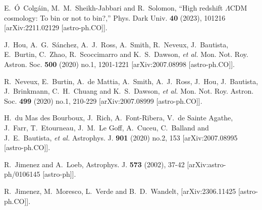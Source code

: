 \documentclass[a4paper,11pt]{article}
\begin{document}
\begin{thebibliography}{99}
E.~\'O~Colg\'ain, M.~M.~Sheikh-Jabbari and R.~Solomon,
``High redshift \ensuremath{\Lambda}CDM cosmology: To bin or not to bin?,''
Phys. Dark Univ. \textbf{40} (2023), 101216
[arXiv:2211.02129 [astro-ph.CO]].

J.~Hou, A.~G.~S\'anchez, A.~J.~Ross, A.~Smith, R.~Neveux, J.~Bautista, E.~Burtin, C.~Zhao, R.~Scoccimarro and K.~S.~Dawson, \textit{et al.}
Mon. Not. Roy. Astron. Soc. \textbf{500} (2020) no.1, 1201-1221
[arXiv:2007.08998 [astro-ph.CO]].

R.~Neveux, E.~Burtin, A.~de Mattia, A.~Smith, A.~J.~Ross, J.~Hou, J.~Bautista, J.~Brinkmann, C.~H.~Chuang and K.~S.~Dawson, \textit{et al.}
Mon. Not. Roy. Astron. Soc. \textbf{499} (2020) no.1, 210-229
[arXiv:2007.08999 [astro-ph.CO]].

H.~du Mas des Bourboux, J.~Rich, A.~Font-Ribera, V.~de Sainte Agathe, J.~Farr, T.~Etourneau, J.~M.~Le Goff, A.~Cuceu, C.~Balland and J.~E.~Bautista, \textit{et al.}
Astrophys. J. \textbf{901} (2020) no.2, 153
[arXiv:2007.08995 [astro-ph.CO]].

R.~Jimenez and A.~Loeb,
Astrophys. J. \textbf{573} (2002), 37-42
[arXiv:astro-ph/0106145 [astro-ph]].

R.~Jimenez, M.~Moresco, L.~Verde and B.~D.~Wandelt,
[arXiv:2306.11425 [astro-ph.CO]].


\end{thebibliography}
\end{document}
